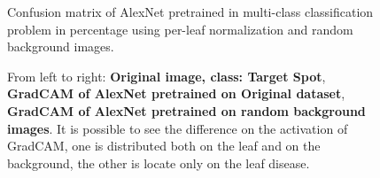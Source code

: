 \begin{figure}[t]
	\begin{center}
	\end{center}
	\caption{Confusion matrix of AlexNet pretrained in multi-class classification problem in percentage using per-leaf normalization and random background images.}
	\label{fig:conf_matrix}
	\label{fig:long}
	\label{fig:onecol}
\end{figure}
\begin{figure}[t]
	\begin{center}
	\end{center}
	\caption{From left to right: \textbf{Original image, class: Target Spot}, \textbf{GradCAM of AlexNet pretrained on Original dataset}, \textbf{GradCAM of AlexNet pretrained on random background images}. It is possible to see the difference on the activation of GradCAM, one is distributed both on the leaf and on the background, the other is locate only on the leaf disease.}
	\label{fig:gradcam}
	\label{fig:long}
	\label{fig:onecol}
\end{figure}
